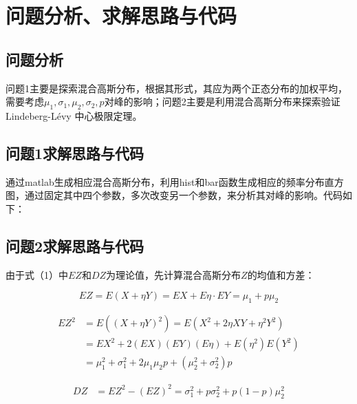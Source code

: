 \documentclass[CJK]{ctexart}
\begin{document}
\section{问题分析、求解思路与代码}

\subsection{问题分析}

问题1主要是探索混合高斯分布，根据其形式，其应为两个正态分布的加权平均，需要考虑$\mu_1,\sigma_1,\mu_2,\sigma_2,p$对峰的影响；问题2主要是利用混合高斯分布来探索验证 Lindeberg-L\'{e}vy 中心极限定理。

\subsection{问题1求解思路与代码}

通过matlab生成相应混合高斯分布，利用hist和bar函数生成相应的频率分布直方图，通过固定其中四个参数，多次改变另一个参数，来分析其对峰的影响。代码如下：




\subsection{问题2求解思路与代码}

由于式（1）中$EZ$和$DZ$为理论值，先计算混合高斯分布$Z$的均值和方差：

\begin{equation}
    EZ = E(X+\eta Y) = EX+E\eta \cdot EY = \mu_1 + p\mu_2
\end{equation}

\begin{equation}
    \begin{aligned}
        EZ^2 &= E((X+\eta Y)^2) = E(X^2 + 2\eta XY + \eta^2 Y^2) \\
             &= EX^2 + 2(EX)(EY)(E\eta) + E(\eta^2)E(Y^2) \\
             &= \mu_1^2 + \sigma_1^2 + 2\mu_1 \mu_2 p + (\mu_2^2 + \sigma_2^2) p   
    \end{aligned}
\end{equation}

\begin{equation}
    \begin{aligned}
        DZ &= EZ^2 - (EZ)^2 = \sigma_1^2 + p \sigma_2^2 + p(1-p)\mu_2^2
    \end{aligned}
\end{equation}
\end{document}

